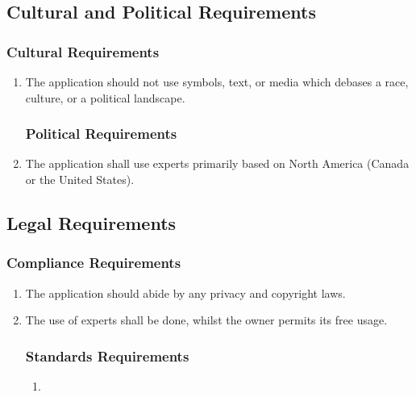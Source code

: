 \documentclass[]{article}
\begin{document}

\subsection{Cultural and Political Requirements}
\label{sub:cultural_and_political_requirements}

\subsubsection{Cultural Requirements}
\label{ssub:cultural_requirements}
\begin{enumerate}[{CP}1. ]
	\item The application should not use symbols, text, or media which debases a race, culture, or a political landscape.

\subsubsection{Political Requirements}
\label{ssub:political_requirements}
	\item The application shall use experts primarily based on North America (Canada or the United States). 
\end{enumerate}


\subsection{Legal Requirements}
\label{sub:legal_requirements}

\subsubsection{Compliance Requirements}
\label{ssub:compliance_requirements}
\begin{enumerate}[{LR}1. ]
	\item The application should abide by any privacy and copyright laws.
	\item The use of experts shall be done, whilst the owner permits its free usage.

\subsubsection{Standards Requirements}
\label{ssub:standards_requirements}
\begin{enumerate}[{N/A} ]
	\item
\end{enumerate}
\end{enumerate}
\end{document}
